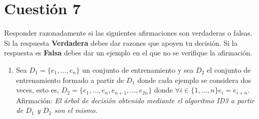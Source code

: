 \documentclass{article}
\begin{document}
\section*{Cuestión 7}
Responder razonadamente si las siguientes afirmaciones son verdaderas o falsas. Si la respuesta \textbf{Verdadera} debes dar razones que apoyen tu decisión. Si la respuesta es \textbf{Falsa} debes dar un ejemplo en el que no se verifique la afirmación.
\begin{enumerate}
    \item Sea $D_1 = \{e_1,..., e_n\}$ un conjunto de entrenamiento y sea $D_2$ el conjunto de entrenamiento formado a partir de $D_1$ donde cada ejemplo se considera dos veces, esto es, $D_2 = \{e_1,...,e_n,e_{n+1},...,e_{2n}\}$ donde $\forall i\in\{1,...,n\}e_i = e_{i+n}$. Afirmación: \emph{El árbol de decisión obtenido mediante el algoritmo ID3 a partir de $D_1$ y $D_2$ son el mismo}.\\
    

\end{enumerate}
\end{document}
